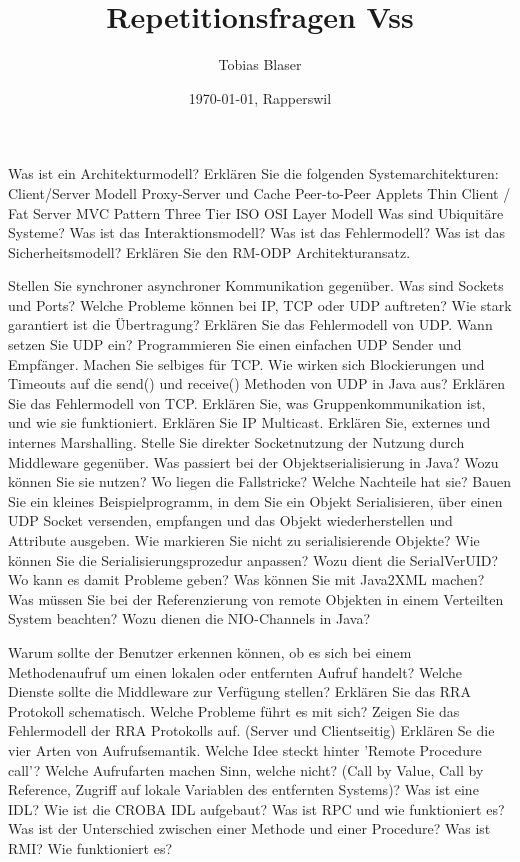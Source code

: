 \documentclass[ngerman,a4paper,12pt]{scrreprt}
\title{Repetitionsfragen Vss}
\author{Tobias Blaser}
\date{\today{}, Rapperswil}
\begin{document}
\tableofcontents
\clearpage

\ol
	\li Was ist ein Architekturmodell?
	\li Erklären Sie die folgenden Systemarchitekturen:
		\ul
			\li Client/Server Modell
			\li Proxy-Server und Cache
			\li Peer-to-Peer
			\li Applets
			\li Thin Client / Fat Server
			\li MVC Pattern
			\li Three Tier
			\li ISO OSI Layer Modell
		\ulE
	\li Was sind Ubiquitäre Systeme?
	\li Was ist das Interaktionsmodell?
	\li Was ist das Fehlermodell?
	\li Was ist das Sicherheitsmodell?
	\li Erklären Sie den RM-ODP Architekturansatz.
\olS


\olR
	\li Stellen Sie synchroner asynchroner Kommunikation gegenüber.
	\li Was sind Sockets und Ports?
	\li Welche Probleme können bei IP, TCP oder UDP auftreten? Wie stark garantiert ist die Übertragung?
	\li Erklären Sie das Fehlermodell von UDP.
	\li Wann setzen Sie UDP ein?
	\li Programmieren Sie einen einfachen UDP Sender und Empfänger. Machen Sie selbiges für TCP.
	\li Wie wirken sich Blockierungen und Timeouts auf die send() und receive() Methoden von UDP in Java aus?
	\li Erklären Sie das Fehlermodell von TCP.
	\li Erklären Sie, was Gruppenkommunikation ist, und wie sie funktioniert. Erklären Sie IP Multicast.
	\li Erklären Sie, externes und internes Marshalling.
	\li Stelle Sie direkter Socketnutzung der Nutzung durch Middleware gegenüber.
	\li Was passiert bei der Objektserialisierung in Java? Wozu können Sie sie nutzen? Wo liegen die Fallstricke? Welche Nachteile hat sie?
	\li Bauen Sie ein kleines Beispielprogramm, in dem Sie ein Objekt Serialisieren, über einen UDP Socket versenden, empfangen und das Objekt wiederherstellen und Attribute ausgeben.
	\li Wie markieren Sie nicht zu serialisierende Objekte? Wie können Sie die Serialisierungsprozedur anpassen?
	\li Wozu dient die SerialVerUID? Wo kann es damit Probleme geben?
	\li Was können Sie mit Java2XML machen?
	\li Was müssen Sie bei der Referenzierung von remote Objekten in einem Verteilten System beachten?
	\li Wozu dienen die NIO-Channels in Java?
\olS


\olR
	\li Warum sollte der Benutzer erkennen können, ob es sich bei einem Methodenaufruf um einen lokalen oder entfernten Aufruf handelt?
	\li Welche Dienste sollte die Middleware zur Verfügung stellen?
	\li Erklären Sie das RRA Protokoll schematisch. Welche Probleme führt es mit sich?
	\li Zeigen Sie das Fehlermodell der RRA Protokolls auf. (Server und Clientseitig)
	\li Erklären Se die vier Arten von Aufrufsemantik.
	\li Welche Idee steckt hinter 'Remote Procedure call'? Welche Aufrufarten machen Sinn, welche nicht? (Call by Value, Call by Reference, Zugriff auf lokale Variablen des entfernten Systems)?
	\li Was ist eine IDL? Wie ist die CROBA IDL aufgebaut?
	\li Was ist RPC und wie funktioniert es?
	\li Was ist der Unterschied zwischen einer Methode und einer Procedure?
	\li Was ist RMI? Wie funktioniert es?
\olS
\end{document}
